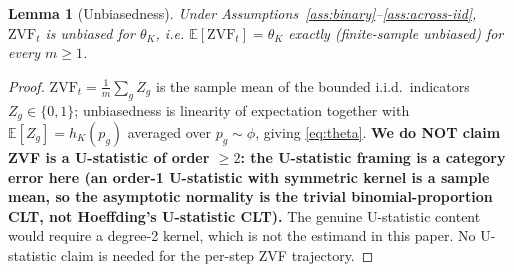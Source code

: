 \documentclass[11pt]{article}
\theoremstyle{plain}
\newtheorem{lemma}{Lemma}
\theoremstyle{definition}
\theoremstyle{remark}
\newcommand{\ZVF}{\ensuremath{\mathrm{ZVF}}}
\newcommand{\E}{\mathbb{E}}
\newcommand{\1}{\mathbb{1}}
\begin{document}
\begin{lemma}[Unbiasedness]\label{lem:ustat}
Under Assumptions~\ref{ass:binary}--\ref{ass:across-iid}, $\ZVF_t$ is
unbiased for $\theta_K$, i.e. $\E[\ZVF_t]=\theta_K$ exactly (finite-sample
unbiased) for every $m\ge 1$.
\end{lemma}
\begin{proof}
$\ZVF_t = \frac1m\sum_g Z_g$ is the sample mean of the bounded i.i.d.\
indicators $Z_g\in\{0,1\}$; unbiasedness is linearity of expectation
together with $\E[Z_g]=h_K(p_g)$ averaged over $p_g\sim\phi$, giving
\eqref{eq:theta}. \textbf{We do NOT claim ZVF is a U-statistic of
order $\ge 2$: the U-statistic framing is a category error here (an
order-1 U-statistic with symmetric kernel is a sample mean, so the
asymptotic normality is the trivial binomial-proportion CLT, not
Hoeffding's U-statistic CLT).} The genuine U-statistic content would
require a degree-2 kernel, which is not the estimand in this paper. No
U-statistic claim is needed for the per-step ZVF trajectory.
\end{proof}
\end{document}

